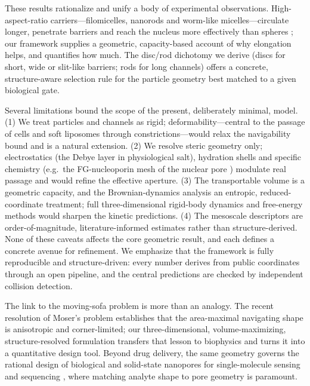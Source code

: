 \documentclass[aps,pre,twocolumn,superscriptaddress,floatfix,nofootinbib]{revtex4-2}
\begin{document}
These results rationalize and unify a body of experimental observations.
High-aspect-ratio carriers---filomicelles, nanorods and worm-like
micelles---circulate longer, penetrate barriers and reach the nucleus more
effectively than spheres \cite{geng2007,champion2006,kinnear2017,yang2010shape};
our framework supplies a geometric, capacity-based account of why elongation
helps, and quantifies how much. The disc/rod dichotomy we derive (discs for
short, wide or slit-like barriers; rods for long channels) offers a concrete,
structure-aware selection rule for the particle geometry best matched to a given
biological gate.

Several limitations bound the scope of the present, deliberately minimal, model.
(1) We treat particles and channels as rigid; deformability---central to the
passage of cells and soft liposomes through constrictions---would relax the
navigability bound and is a natural extension. (2) We resolve steric geometry
only; electrostatics (the Debye layer in physiological salt), hydration shells
and specific chemistry (e.g.\ the FG-nucleoporin mesh of the nuclear pore
\cite{tagliazucchi2013npc}) modulate real passage and would refine the effective
aperture. (3) The transportable volume is a geometric capacity, and the
Brownian-dynamics analysis an entropic, reduced-coordinate treatment; full
three-dimensional rigid-body dynamics and free-energy methods would sharpen the
kinetic predictions. (4) The mesoscale descriptors are order-of-magnitude,
literature-informed estimates rather than structure-derived. None of these
caveats affects the core geometric result, and each defines a concrete avenue for
refinement. We emphasize that the framework is fully reproducible and
structure-driven: every number derives from public coordinates through an open
pipeline, and the central predictions are checked by independent collision
detection.

The link to the moving-sofa problem is more than an analogy. The recent
resolution of Moser's problem \cite{baek2024} establishes that the area-maximal
navigating shape is anisotropic and corner-limited; our three-dimensional,
volume-maximizing, structure-resolved formulation transfers that lesson to
biophysics and turns it into a quantitative design tool. Beyond drug delivery,
the same geometry governs the rational design of biological and solid-state
nanopores for single-molecule sensing and sequencing \cite{manrao2012mspa,
kowalczyk2011nanopore}, where matching analyte shape to pore geometry is
paramount.
\end{document}
